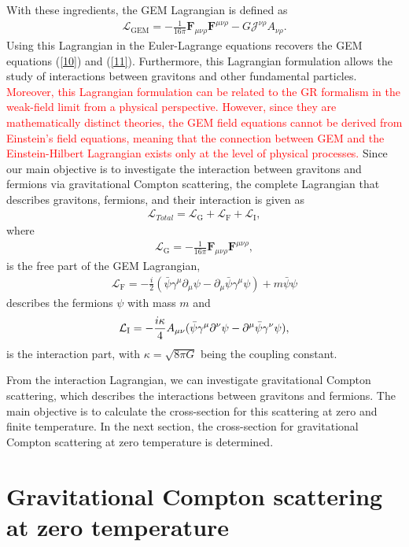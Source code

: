 \documentclass[11pt,showpacs,preprintnumbers,amsmath,amssymb,prd,nofootinbib,superscriptaddress]{revtex4-2}
\newcommand{\bea}{\begin{eqnarray}}
\newcommand{\eea}{\end{eqnarray}}
\begin{document}
With these ingredients, the GEM Lagrangian is defined as
\begin{eqnarray}
     \mathcal{L}_{\text{GEM}}=-\frac{1}{16\pi}\mathbf{F}_{\mu\nu\rho}\mathbf{F}^{\mu\nu\rho}-G\mathcal{J}^{\nu\rho} A_{\nu\rho}.\label{13}
\end{eqnarray}
Using this Lagrangian in the Euler-Lagrange equations recovers the GEM equations (\ref{10}) and (\ref{11}). Furthermore, this Lagrangian formulation allows the study of interactions between gravitons and other fundamental particles. \textcolor{red}{Moreover, this Lagrangian formulation can be related to the GR formalism in the weak-field limit from a physical perspective. However, since they are mathematically distinct theories, the GEM field equations cannot be derived from Einstein's field equations, meaning that the connection between GEM and the Einstein-Hilbert Lagrangian exists only at the level of physical processes.} Since our main objective is to investigate the interaction between gravitons and fermions via gravitational Compton scattering, the complete Lagrangian that describes gravitons, fermions, and their interaction is given as
\bea
\mathcal{L}_{Total}= \mathcal{L}_{\text{G}}+ \mathcal{L}_{\text{F}}+ \mathcal{L}_{\text{I}},
\eea
where
\begin{eqnarray}
     \mathcal{L}_{\text{G}}=-\frac{1}{16\pi}\mathbf{F}_{\mu\nu\rho}\mathbf{F}^{\mu\nu\rho},
\end{eqnarray}
is the free part of the GEM Lagrangian,
\bea
\mathcal{L}_{\text{F}}=-\frac{i}{2}(\bar{\psi}\gamma^\mu\partial_\mu\psi-\partial_\mu\bar{\psi}\gamma^\mu\psi)+m\bar{\psi}\psi
\eea
describes the fermions $\psi$ with mass $m$ and 
\bea
 \mathcal{L}_{\text{I}}=-\frac{i\kappa}{4}A_{\mu\nu}(\Bar{\psi}\gamma^\mu\partial^\nu\psi-\partial^\mu\Bar{\psi}\gamma^\nu\psi),\label{lagrangeint}
\eea
is the interaction part, with $\kappa=\sqrt{8\pi G}$ being the coupling constant. 

From the interaction Lagrangian, we can investigate gravitational Compton scattering, which describes the interactions between gravitons and fermions. The main objective is to calculate the cross-section for this scattering at zero and finite temperature. In the next section, the cross-section for gravitational Compton scattering at zero temperature is determined.

\section{Gravitational Compton scattering at zero temperature}\label{III}
\end{document}
